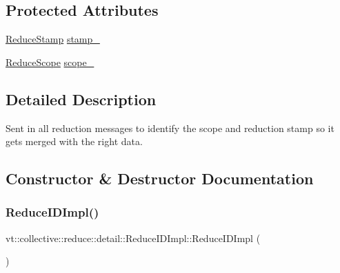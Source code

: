 \subsection*{Protected Attributes}
\begin{DoxyCompactItemize}
\item 
\hyperlink{namespacevt_1_1collective_1_1reduce_1_1detail_abcd205dec83706f347d55c7528bf2664}{Reduce\+Stamp} \hyperlink{structvt_1_1collective_1_1reduce_1_1detail_1_1_reduce_i_d_impl_a84804f019298c0321847c09749ced0bb}{stamp\+\_\+}
\item 
\hyperlink{structvt_1_1collective_1_1reduce_1_1detail_1_1_reduce_scope}{Reduce\+Scope} \hyperlink{structvt_1_1collective_1_1reduce_1_1detail_1_1_reduce_i_d_impl_afc9cc556d4e84fe7c41944102a926d59}{scope\+\_\+}
\end{DoxyCompactItemize}


\subsection{Detailed Description}
Sent in all reduction messages to identify the scope and reduction stamp so it gets merged with the right data. 



\subsection{Constructor \& Destructor Documentation}
\mbox{\label{structvt_1_1collective_1_1reduce_1_1detail_1_1_reduce_i_d_impl_a02838391cc76625466de53c8197baead}} 
\subsubsection{\texorpdfstring{Reduce\+I\+D\+Impl()}{ReduceIDImpl()}\hspace{0.1cm}{\footnotesize\ttfamily [1/4]}}
{\footnotesize\ttfamily vt\+::collective\+::reduce\+::detail\+::\+Reduce\+I\+D\+Impl\+::\+Reduce\+I\+D\+Impl (\begin{DoxyParamCaption}{ }\end{DoxyParamCaption})\hspace{0.3cm}{\ttfamily [default]}}

